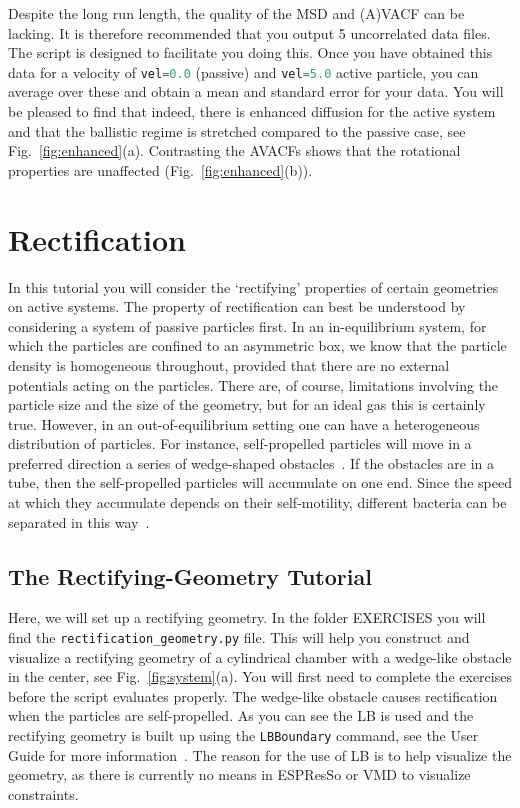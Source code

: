 \documentclass[aip,jcp,reprint,a4paper,onecolumn,amsmath]{revtex4-1}
\newcommand\code{\lstinline}
\newcommand{\es}{\mbox{\textsf{ESPResSo}}\xspace}
\newcommand\codees{\lstinline[language=python]}
\begin{document}
Despite the long run length, the quality of the MSD and (A)VACF can be lacking. It is therefore recommended that you output 5 uncorrelated data files. The script is designed to facilitate you doing this. Once you have obtained this data for a velocity of \codees{vel=0.0} (passive) and \codees{vel=5.0} active particle, you can average over these and obtain a mean and standard error for your data. You will be pleased to find that indeed, there is enhanced diffusion for the active system and that the ballistic regime is stretched compared to the passive case, see Fig.~\ref{fig:enhanced}(a). Contrasting the AVACFs shows that the rotational properties are unaffected (Fig.~\ref{fig:enhanced}(b)).

\section{\label{sec:rectify}Rectification}

In this tutorial you will consider the `rectifying' properties of certain geometries on active systems. The property of rectification can best be understood by considering a system of passive particles first. In an in-equilibrium system, for which the particles are confined to an asymmetric box, we know that the particle density is homogeneous throughout, provided that there are no external potentials acting on the particles. There are, of course, limitations involving the particle size and the size of the geometry, but for an ideal gas this is certainly true. However, in an out-of-equilibrium setting one can have a heterogeneous distribution of particles. For instance, self-propelled particles will move in a preferred direction a series of wedge-shaped obstacles~\cite{Berdakin13a}. If the obstacles are in a tube, then the self-propelled particles will accumulate on one end. Since the speed at which they accumulate depends on their self-motility, different bacteria can be separated in this way~\cite{Berdakin13b}.

\subsection{\label{sub:rgtut}The Rectifying-Geometry Tutorial}

Here, we will set up a rectifying geometry. In the folder EXERCISES you will find the \code{rectification_geometry.py} file. This will help you construct and visualize a rectifying geometry of a cylindrical chamber with a wedge-like obstacle in the center, see Fig.~\ref{fig:system}(a). You will first need to complete the exercises before the script evaluates properly. The wedge-like obstacle causes rectification when the particles are self-propelled. As you can see the LB is used and the rectifying geometry is built up using the \codees{LBBoundary} command, see the User Guide for more information~\cite{UG}. The reason for the use of LB is to help visualize the geometry, as there is currently no means in \es{} or VMD to visualize constraints.
\end{document}
